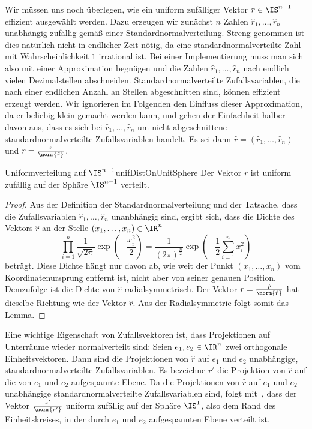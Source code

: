 \documentclass[language=ngerman,algolist]{TemplateLecture}
\begin{document}
Wir müssen uns noch überlegen, wie ein uniform zufälliger Vektor $r \in \IS^{n-1}$ effizient ausgewählt werden. Dazu erzeugen wir zunächst $n$ Zahlen $\hat{r}_1, \ldots, \hat{r}_n$ unabhängig zufällig gemäß einer Standardnormalverteilung. Streng genommen ist dies natürlich nicht in endlicher Zeit nötig, da eine standardnormalverteilte Zahl mit Wahrscheinlichkeit $1$ irrational ist. Bei einer Implementierung muss man sich also mit einer Approximation begnügen und die Zahlen $\hat{r}_1, \ldots, \hat{r}_n$ nach endlich vielen Dezimalstellen abschneiden. Standardnormalverteilte Zufallsvariablen, die nach einer endlichen Anzahl an Stellen abgeschnitten sind, können effizient erzeugt werden. Wir ignorieren im Folgenden den Einfluss dieser Approximation, da er beliebig klein gemacht werden kann, und gehen der Einfachheit halber davon aus, dass es sich bei $\hat{r}_1, \ldots, \hat{r}_n$ um nicht-abgeschnittene standardnormalverteilte Zufallsvariablen handelt. Es sei dann $\hat{r} = (\hat{r}_1, \ldots, \hat{r}_n)$ und $r = \frac{\hat{r}}{\norm{\hat{r}}}$.

\begin{lem}{Uniformverteilung auf $\IS^{n-1}$}{unifDistOnUnitSphere}
    Der Vektor $r$ ist uniform zufällig auf der Sphäre $\IS^{n-1}$ verteilt.
\end{lem}

\begin{proof}
    Aus der Definition der Standardnormalverteilung und der Tatsache, dass die Zufallsvariablen $\hat{r}_1, \ldots, \hat{r}_n$ unanbhängig sind, ergibt sich, dass die Dichte des Vektors $\hat{r}$ an der Stelle $(x_1, \ldots, x_n) \in \IR^n$ 
    \begin{equation*}
        \prod_{i = 1}^n \frac{1}{\sqrt{2\pi}}\exp\left( -\frac{x_i^2}{2} \right) = \frac{1}{(2\pi)^{\frac{n}{2}}} \exp\left( -\frac{1}{2} \sum_{i = 1}^n x_i^2 \right)
    \end{equation*}
    beträgt. Diese Dichte hängt nur davon ab, wie weit der Punkt $(x_1, \ldots, x_n)$ vom Koordinatenursprung entfernt ist, nicht aber von seiner genauen Position. Demzufolge ist die Dichte von $\hat{r}$ radialsymmetrisch. Der Vektor $r = \frac{\hat{r}}{\norm{\hat{r}}}$ hat dieselbe Richtung wie der Vektor $\hat{r}$. Aus der Radialsymmetrie folgt somit das Lemma.
\end{proof}



Eine wichtige Eigenschaft von Zufallsvektoren ist, dass Projektionen auf Unterräume wieder normalverteilt sind: Seien $e_1, e_2 \in \IR^n$ zwei orthogonale Einheitsvektoren. Dann sind die Projektionen von $\hat{r}$ auf $e_1$ und $e_2$ unabhängige, standardnormalverteilte Zufallsvariablen. Es bezeichne $r'$ die Projektion von $\hat{r}$ auf die von $e_1$ und $e_2$ aufgespannte Ebene. Da die Projektionen von $\hat{r}$ auf $e_1$ und $e_2$ unabhängige standardnormalverteilte Zufallsvariablen sind, folgt mit~, dass der Vektor $\frac{r'}{\norm{r'}}$ uniform zufällig auf der Sphäre $\IS^1$, also dem Rand des Einheitskreises, in der durch $e_1$ und $e_2$ aufgespannten Ebene verteilt ist.
\end{document}
